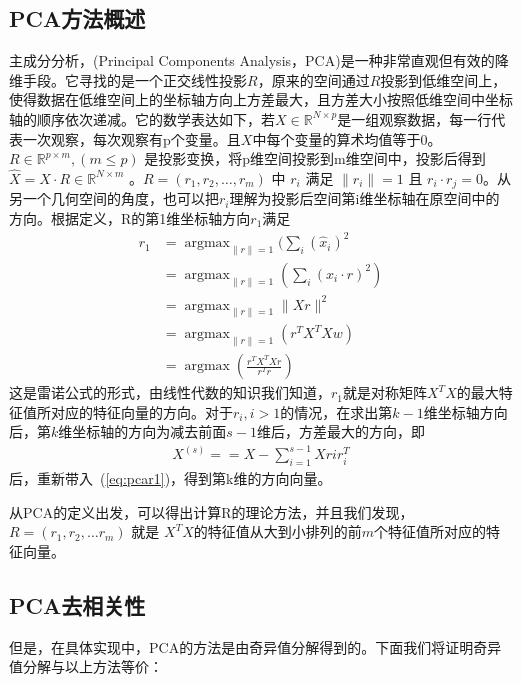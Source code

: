     \subsection{PCA方法概述}
    主成分分析，(Principal Components Analysis，PCA)是一种非常直观但有效的降维手段。它寻找的是一个正交线性投影$R$，原来的空间通过$R$投影到低维空间上，使得数据在低维空间上的坐标轴方向上方差最大，且方差大小按照低维空间中坐标轴的顺序依次递减。它的数学表达如下，若$X \in \mathbb{R}^{N \times p}  $是一组观察数据，每一行代表一次观察，每次观察有p个变量。且$X$中每个变量的算术均值等于0。$R \in \mathbb{R} ^{p \times m}, (m \leqslant p) $ 是投影变换，将p维空间投影到m维空间中，投影后得到$\hat{X} = X\cdot R \in \mathbb{R}^{N \times m}$ 。$R = (r_1, r_2, \dots, r_m)$ 中 $r_i$ 满足 $ \|r_i\| = 1$ 且 $r_i \cdot r_j = 0$。从另一个几何空间的角度，也可以把$r_i$理解为投影后空间第i维坐标轴在原空间中的方向。根据定义，R的第1维坐标轴方向$r_{1}$满足
    \begin{equation}
    \label{eq:pcar1}
    \begin{split}
        r_{1} & = \mathop{\arg\max}_{\|r\|=1} (\sum_i(\hat{x} _i)^2 \\
        & = \mathop{\arg\max}_{\|r\| = 1}(\sum_i(x_{i}\cdot r)^2) \\
        & = \mathop{\arg\max} _{\|r\|=1} \|Xr\|^2 \\
        & = \mathop{arg\max}_{\|r\|= 1} (r^TX^TXw) \\
        & = \mathop{\arg\max} (\frac{r^TX^TXr}{r^Tr}) 
    \end{split}
    \end{equation}
    这是雷诺公式\cite{trefethen1997numerical}的形式，由线性代数的知识我们知道，$r_1$就是对称矩阵$X^TX$的最大特征值所对应的特征向量的方向。对于$r_i, i > 1$的情况，在求出第$k-1$维坐标轴方向后，第$k$维坐标轴的方向为减去前面$s-1$维后，方差最大的方向，即
    \begin{equation}
    \begin{split}
        X^{(s)} = = X - \sum^{s - 1}_{i = 1} Xr{i}r_{i}^T
    \end{split}    
    \end{equation}
    后，重新带入~(\ref{eq:pcar1})，得到第k维的方向向量。

    从PCA的定义出发，可以得出计算R的理论方法，并且我们发现，$R = (r_1, r_2, \dots r_m)$ 就是 $X^T X$的特征值从大到小排列的前$m$个特征值所对应的特征向量。

    \subsection{PCA去相关性}
    但是，在具体实现中，PCA的方法是由奇异值分解得到的。下面我们将证明奇异值分解与以上方法等价：
    
